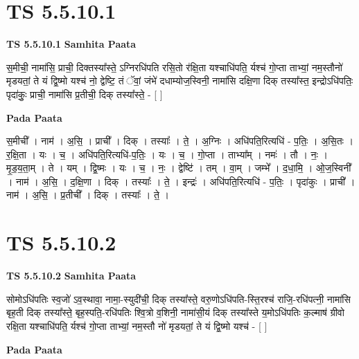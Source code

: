 \documentclass[17pt]{extarticle}
\begin{document}

\section{ TS 5.5.10.1 }

\textbf{TS 5.5.10.1 } \newline
\textbf{Samhita Paata} \newline

स॒॒मीची॒॒ नामा॑सि॒ प्राची॒ दिक्तस्या᳚स्ते॒ ऽग्निरधि॑पति रसि॒तो र॑क्षि॒ता यश्चाधि॑पति॒ र्यश्च॑ गो॒प्ता ताभ्यां॒ नम॒स्तौनो॑ मृडयतां॒ ते यं द्वि॒ष्मो यश्च॑ नो॒ द्वेष्टि॒ तं ॅवां॒ जंभे॑ दधाम्योज॒स्विनी॒ नामा॑सि दक्षि॒णा दिक् तस्या᳚स्त॒ इन्द्रोऽधि॑पतिः॒ पृदा॑कुः॒ प्राची॒ नामा॑सि प्र॒तीची॒ दिक् तस्या᳚स्ते॒ - [  ] \newline

\textbf{Pada Paata} \newline

स॒मीची᳚ । नाम॑ । अ॒सि॒ । प्राची᳚ । दिक् । तस्याः᳚ । ते॒ । अ॒ग्निः । अधि॑पति॒रित्यधि॑ - प॒तिः॒ । अ॒सि॒तः । र॒क्षि॒ता । यः । च॒ । अधि॑पति॒रित्यधि॑-प॒तिः॒ । यः । च॒ । गो॒प्ता । ताभ्या᳚म् । नमः॑ । तौ । नः॒ । मृ॒ड॒य॒ता॒म् । ते । यम् । द्वि॒ष्मः । यः । च॒ । नः॒ । द्वेष्टि॑ । तम् । वा॒म् । जम्भे᳚ । द॒धा॒मि॒ । ओ॒ज॒स्विनी᳚ । नाम॑ । अ॒सि॒ । द॒क्षि॒णा । दिक् । तस्याः᳚ । ते॒ । इन्द्रः॑ । अधि॑पति॒रित्यधि॑ - प॒तिः॒ । पृदा॑कुः । प्राची᳚ । नाम॑ । अ॒सि॒ । प्र॒तीची᳚ । दिक् । तस्याः᳚ । ते॒ ।  \newline





\section{ TS 5.5.10.2 }

\textbf{TS 5.5.10.2 } \newline
\textbf{Samhita Paata} \newline

सोमोऽधि॑पतिः स्व॒जो॑ ऽव॒स्थावा॒ नामा॒-स्युदी॑ची॒ दिक् तस्या᳚स्ते॒ वरु॒णोऽधि॑पति-स्ति॒रश्च॑ राजि॒-रधि॑पत्नी॒ नामा॑सि बृह॒ती दिक् तस्या᳚स्ते॒ बृह॒स्पति॒-रधि॑पतिः श्वि॒त्रो व॒शिनी॒ नामा॑सी॒यं दिक् तस्या᳚स्ते य॒मोऽधि॑पतिः क॒ल्माष॑ ग्रीवो रक्षि॒ता यश्चाधि॑पति॒ र्यश्च॑ गो॒प्ता ताभ्यां॒ नम॒स्तौ नो॑ मृडयतां॒ ते यं द्वि॒ष्मो यश्च॑ - [  ] \newline

\textbf{Pada Paata} \newline
\end{document}

